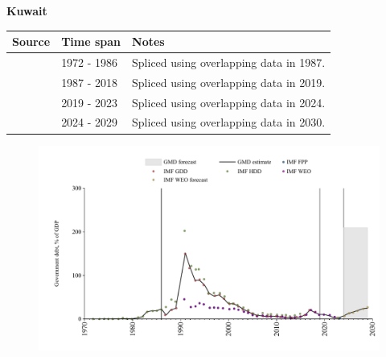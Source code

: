 \documentclass[12pt,a4paper,landscape]{article}
\begin{document}
\begin{adjustbox}{max totalsize={\paperwidth}{\paperheight},center}
\begin{minipage}[t][\textheight][t]{\textwidth}
\vspace*{0.5cm}
{}
\begin{center}
{\Large\bfseries Kuwait}
\end{center}
\vspace{0.5cm}
\begin{table}[H]
\centering
\small
\begin{tabular}{|l|l|l|}
\hline
\textbf{Source} & \textbf{Time span} & \textbf{Notes} \\
\hline
\rowcolor{white}\cite{IMF_HDD}& 1972 - 1986 &Spliced using overlapping data in 1987.\\
\rowcolor{lightgray}\cite{IMF_GDD}& 1987 - 2018 &Spliced using overlapping data in 2019.\\
\rowcolor{white}\cite{IMF_FPP}& 2019 - 2023 &Spliced using overlapping data in 2024.\\
\rowcolor{lightgray}\cite{IMF_WEO_forecast}& 2024 - 2029 &Spliced using overlapping data in 2030.\\
\hline
\end{tabular}
\end{table}
\begin{figure}[H]
\centering
\includegraphics[width=\textwidth,height=0.6\textheight,keepaspectratio]{graphs/KWT_govdebt_GDP.pdf}
\end{figure}
\end{minipage}
\end{adjustbox}
\end{document}

